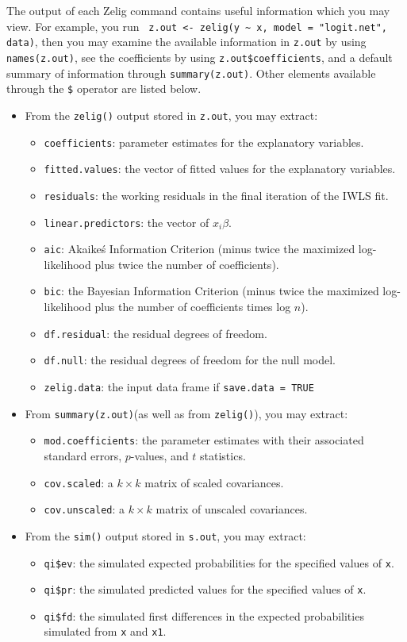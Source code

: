 The output of each Zelig command contains useful information which you may view. For example, you run \verb{ z.out <- zelig(y ~ x, model = "logit.net", data){, then you may examine the available information in {\tt z.out} by using {\tt names(z.out)}, see the coefficients by using {\tt z.out\$coefficients}, and a default summary of information through {\tt summary(z.out)}. Other elements available through the {\tt \$} operator are listed below. 
\begin{itemize}
\item From the {\tt zelig()} output stored in {\tt  z.out}, you may extract:
\begin{itemize}
\item {\tt coefficients}: parameter estimates for the explanatory variables.
\item {\tt fitted.values}: the vector of fitted values for the explanatory variables.
\item {\tt residuals}: the working residuals in the final iteration of the IWLS fit. 
\item {\tt linear.predictors}: the vector of $x_{i}\beta$.
\item {\tt aic}: Akaike\'s Information Criterion (minus twice the maximized log-likelihood plus twice the number of coefficients).
\item {\tt bic}: the Bayesian Information Criterion (minus twice the maximized log-likelihood plus the number of coefficients times log $n$).
\item {\tt df.residual}: the residual degrees of freedom.
\item {\tt df.null}: the residual degrees of freedom for the null model. 
\item {\tt zelig.data}: the input data frame if {\tt save.data = TRUE} 

\end{itemize}
\item From {\tt summary(z.out)}(as well as from {\tt zelig()}), you may extract:
\begin{itemize}
\item {\tt mod.coefficients}: the parameter estimates with their associated standard errors, $p$-values, and $t$ statistics. 
\item {\tt cov.scaled}: a $k \times k$ matrix of scaled covariances.
\item {\tt cov.unscaled}: a $k \times k$ matrix of unscaled covariances. 
\end{itemize}
\item From the {\tt sim()} output stored in {\tt s.out}, you may extract:
\begin{itemize}
\item {\tt qi\$ev}: the simulated expected probabilities for the specified values of {\tt x}.
\item {\tt qi\$pr}: the simulated predicted values for the specified values of {\tt x}.
\item {\tt qi\$fd}: the simulated first differences in the expected probabilities simulated from {\tt x} and {\tt x1}.
\end{itemize}
\end{itemize}


